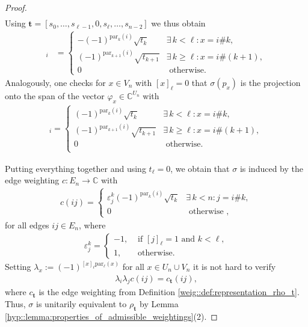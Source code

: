 \documentclass[10pt,a4paper]{amsart}
\newcommand{\C}{\mathbb{C}}
\begin{document}
\begin{proof}
\begin{align*}
    \end{align*}
    Using $\mathbf{t} = [s_0, \dots, s_{\ell-1}, 0, s_\ell, \dots, s_{n-2}]$ we thus obtain
    \begin{align*}
        [\varphi_x]_{i} &= \begin{cases}
            -(-1)^{\mathrm{par}_k(i)} \sqrt{t_k}        &\exists \, k < \ell : x = i \# k, \\
            (-1)^{\mathrm{par}_{k+1}(i)} \sqrt{t_{k+1}}       &\exists \, k \geq \ell : x = i \# (k+1), \\
            0                                           &\text{ otherwise.}
        \end{cases}
    \end{align*}
    Analogously, one checks for $x \in V_n$ with $[x]_\ell = 0$ that $\sigma(p_x)$ is the projection onto the span of the vector $\varphi_x \in \C^{U_n}$ with
    \begin{align*}
        [\varphi_x]_i = \begin{cases}
            (-1)^{\mathrm{par}_k(i)} \sqrt{t_k}                &\exists \, k < \ell : x = i \# k, \\
            (-1)^{\mathrm{par}_{k+1}(i)} \sqrt{t_{k+1}}         &\exists \, k \geq \ell : x = i \# (k+1), \\
            0                                                   &\text{ otherwise.}  \\                                
        \end{cases}
    \end{align*}
    
    Putting everything together and using $t_\ell = 0$, we obtain that $\sigma$ is induced by the edge weighting $c: E_n \to \C$ with
    \begin{align*}
        c(ij) = \begin{cases}
            \varepsilon_{j}^k (-1)^{\mathrm{par}_k(i)} \sqrt{t_k}        &\exists \, k < n : j = i \# k, \\
            0                                           &\text{ otherwise },
        \end{cases}
    \end{align*}
    for all edges $ij \in E_n$, where
    \begin{align*}
        \varepsilon_j^k = \begin{cases}
            -1,    & \text{ if } [j]_\ell = 1 \text{ and } k < \ell, \\
            1,     & \text{ otherwise.}
        \end{cases}
    \end{align*}
    Setting $\lambda_x := (-1)^{[x]_\ell \mathrm{par}_\ell(x)}$ for all $x \in U_n \cup V_n$ it is not hard to verify
    \begin{align*}
        \lambda_i \lambda_j c(ij) = c_\mathbf{t}(ij),
    \end{align*}
    where $c_\mathbf{t}$ is the edge weighting from Definition \ref{weig::def:representation_rho_t}. Thus, $\sigma$ is unitarily equivalent to $\rho_\mathbf{t}$ by Lemma \ref{hyp::lemma:properties_of_admissible_weightings}(2).
\end{proof}
\end{document}
